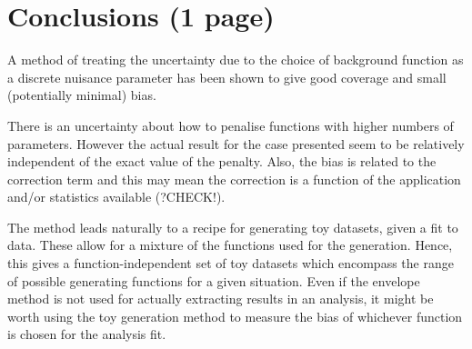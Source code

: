 \section{Conclusions (1 page)}
\label{sec:conclusions}

A method of treating the uncertainty due to the choice of background function
as a discrete nuisance parameter has been shown to give good coverage and
small (potentially minimal) bias.

There is an uncertainty about how to penalise functions with higher numbers
of parameters. However the actual result for the case presented
seem to be relatively independent of the exact value of the penalty.
Also, the bias is related to the correction term and this may mean the
correction is a function of the application and/or statistics available (?CHECK!).

The method leads naturally to a recipe for generating toy datasets, given
a fit to data. These allow for a mixture of the functions used for the
generation. Hence, this gives a function-independent set of toy
datasets which encompass the range of possible generating functions for
a given situation.
Even if the envelope method is not used for actually extracting results
in an analysis, it might be worth using the toy generation method to measure
the bias of whichever function is chosen for the analysis fit.
